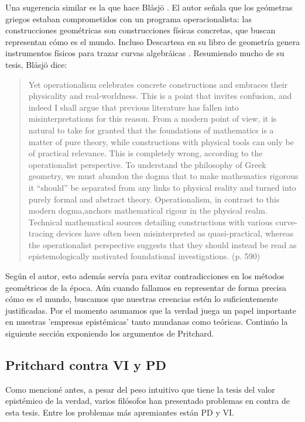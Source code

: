 Una sugerencia similar es la que hace Blåsjö \parencite{blasjo2022}.
El autor señala que los geómetras griegos estaban comprometidos con un programa operacionalista: las construcciones geométricas son construcciones físicas concretas, que buscan representan cómo es el mundo.
Incluso Descartesa en su libro de geometría genera instrumentos físicos para trazar curvas algebráicas \parencite{descartes2018}. 
Resumiendo mucho de su tesis, Blåsjö dice:

\begin{quote}
    Yet operationalism celebrates concrete constructions and embraces their physicality and real-worldness. This is a point that invites confusion, and indeed I shall argue that previous literature has fallen into misinterpretations for this reason. From a modern point of view, it is natural to take for granted that the foundations of mathematics is a matter of pure theory, while constructions with physical tools can only be of practical relevance. This is completely wrong, according to the operationalist perspective. To understand the philosophy of Greek geometry, we must abandon the dogma that to make mathematics rigorous it “should” be separated from any links to physical reality and turned into purely formal and abstract theory. Operationalism, in contrast to this modern dogma,anchors mathematical rigour in the physical realm. Technical mathematical sources detailing constructions with various curve-tracing devices have often been misinterpreted as quasi-practical, whereas the operationalist perspective suggests that they should instead be read as epistemologically motivated foundational investigations. (p. 590)
\end{quote}

Según el autor, esto además servía para evitar contradicciones en los métodos geométricos de la época.
Aún cuando fallamos en representar de forma precisa cómo es el mundo, buscamos que nuestras creencias estén lo suficientemente justificadas. 
Por el momento asumamos que la verdad juega un papel importante en nuestras 'empresas epistémicas' tanto mundanas como teóricas.
Continúo la siguiente sección exponiendo los argumentos de Pritchard.


\subsection{Pritchard contra VI y PD}

Como mencioné antes, a pesar del peso intuitivo que tiene la tesis del valor epistémico de la verdad, varios filósofos han presentado problemas en contra de esta tesis.
Entre los problemas más apremiantes están  PD y VI.


